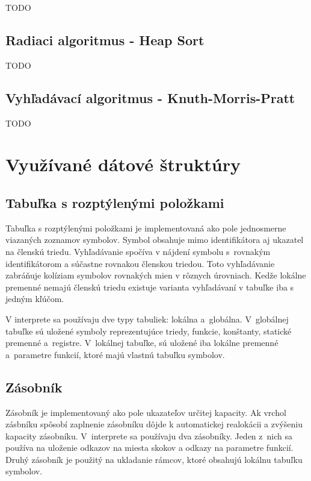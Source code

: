 \documentclass[11pt,a4paper]{article}
\begin{document}
TODO

    \subsection{Radiaci algoritmus - Heap Sort}
    
    TODO

    \subsection{Vyhľadávací algoritmus - Knuth-Morris-Pratt}
    
    TODO
    
\section{Využívané dátové štruktúry} 
\label{struktury}

        \subsection{Tabuľka s rozptýlenými položkami}
        Tabuľka s rozptýlenými položkami je implementovaná ako pole jednosmerne viazaných zoznamov symbolov. Symbol obsahuje
        mimo identifikátora aj ukazatel na členskú triedu. Vyhľadávanie spočíva v nájdení symbolu s~rovnakým identifikátorom
        a súčastne rovnakou členskou triedou. Toto vyhľadávanie zabráňuje kolíziam symbolov rovnakých mien v rôznych úrovniach.
        Kedže lokálne premenné nemajú členskú triedu existuje varianta vyhľadávaní v tabuľke iba s jedným kľúčom.

        V interprete sa používaju dve typy tabuliek: lokálna a~globálna. V~globálnej tabuľke sú uložené symboly reprezentujúce
        triedy, funkcie, konštanty, statické premenné a~registre. V~lokálnej tabuľke, sú uložené iba lokálne premenné a~parametre
        funkcií, ktoré majú vlastnú tabuľku symbolov.

        \subsection{Zásobník}
        Zásobník je implementovaný ako pole ukazateľov určitej kapacity. Ak vrchol zásbníku spôsobí zaplnenie zásobníku dôjde
        k automatickej realokácii a zvýšeniu kapacity zásobníku. V~interprete sa používaju dva zásobníky. Jeden z~nich
        sa používa na uloženie odkazov na miesta skokov a odkazy na parametre funkcií. Druhý zásobník je použitý na ukladanie
        rámcov, ktoré obsahujú lokálnu tabuľku symbolov.
\end{document}
